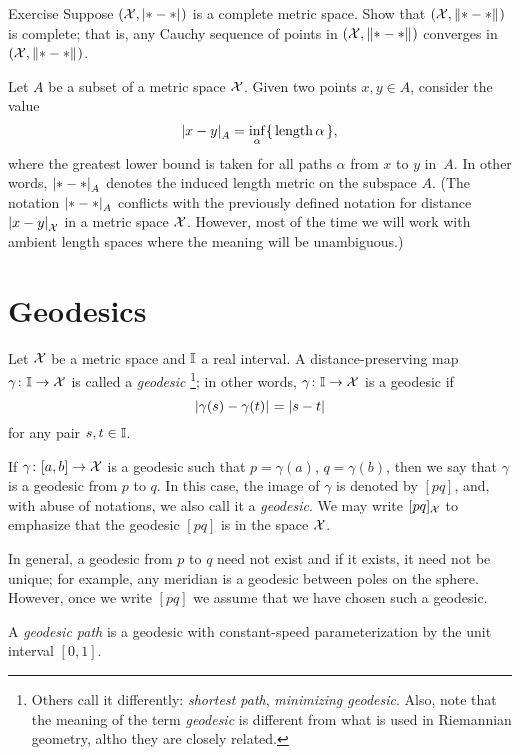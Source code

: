\begin{thm}{Exercise}\label{ex:compact=>complete}
Suppose $(\mathcal{X},|{*}-{*}|_{}^{{}})$ is a complete metric space.
Show that $(\mathcal{X},\|{*}-{*}\|_{}^{{}})$ is complete;
that is, any Cauchy sequence of points in $(\mathcal{X},\|{*}-{*}\|_{}^{{}})$ converges in $(\mathcal{X},\|{*}-{*}\|_{}^{{}})$.
\end{thm}

Let $A$ be a subset of a metric space $\mathcal{X}$.
Given two points $x,y\in A$,
consider the value
\[|{x}-{y}|_{A}^{{}}=\inf_{\alpha}\{\,\mathop{\rm length}\nolimits\alpha\,\},\]
where the greatest lower bound is taken for all paths $\alpha$ from $x$ to $y$ in~$A$.
In other words, $|{*}-{*}|_{A}^{{}}$ denotes the induced length metric on the subspace $A$.
(The notation $|{*}-{*}|_{A}^{{}}$ conflicts with the previously defined notation for distance $|{x}-{y}|_{\mathcal{X}}^{{}}$ in a metric space $\mathcal{X}$.
However, most of the time we will work with ambient length spaces where the meaning will be unambiguous.)

\section{Geodesics}

Let $\mathcal{X}$ be a metric space 
and $\II$\index{$\II$} a real interval. 
A distance-preserving map $\gamma\colon\mathbb{I}\to \mathcal{X}$ is called a \emph{geodesic}%
\footnote{Others call it differently: \textit{shortest path}, \textit{minimizing geodesic}.
Also, note that the meaning of the term \textit{geodesic} is different from what is used in Riemannian geometry, altho they are closely related.}; 
in other words, $\gamma\colon\mathbb{I}\to \mathcal{X}$ is a geodesic if 
\[|{\gamma(s)}-{\gamma(t)}|_{}^{{}}=|s-t|\]
for any pair $s,t\in \mathbb{I}$.

If $\gamma\colon[a,b]\to \mathcal{X}$ is a geodesic such that $p=\gamma(a)$, $q=\gamma(b)$, then we say that $\gamma$ is a geodesic from $p$ to $q$.
In this case, the image of $\gamma$ is denoted by $[p q]$\index{$[{*}{*}]$}, and, with abuse of notations, we also call it a \emph{geodesic}.
We may write $[p q]_{\mathcal{X}}$ 
to emphasize that the geodesic $[p q]$ is in the space  ${\mathcal{X}}$.

In general, a geodesic from $p$ to $q$ need not exist and if it exists, it need not  be unique;
for example, any meridian is a geodesic between poles on the sphere.
However, once we write $[p q]$ we assume that we have chosen such a geodesic.

A \emph{geodesic path} is a geodesic with constant-speed parameterization by the unit interval $[0,1]$.

